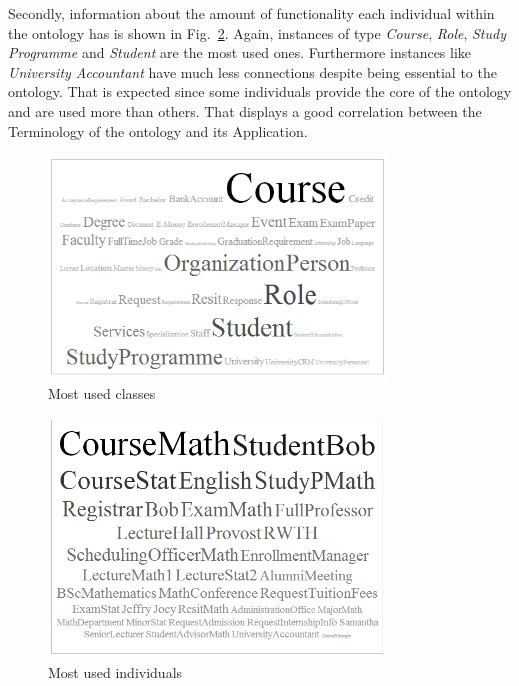 \documentclass{article}    %
\begin{document}
Secondly, information about the amount of functionality each individual within the ontology has is shown in Fig.~\ref{cloudIndi}. Again, instances of type \textit{Course}, \textit{Role}, \textit{Study Programme} and \textit{Student} are the most used ones. Furthermore instances like \textit{University Accountant} have much less connections despite being essential to the ontology. That is expected since some individuals provide the core of the ontology and are used more than others. That displays a good correlation between the Terminology of the ontology and its Application.
\begin{figure}[htbp]
  \centering
    \includegraphics[width=0.8\textwidth]{Materials/Figures/classUsageCloud.png}
    \caption{Most used classes}
  \label{classUsage}
\end{figure}
\begin{figure}[htbp]
  \centering
    \includegraphics[width=0.8\textwidth]{Materials/Figures/cloudIndies.png}
    \caption{Most used individuals}
  \label{cloudIndi}
\end{figure}
% 
\end{document}
